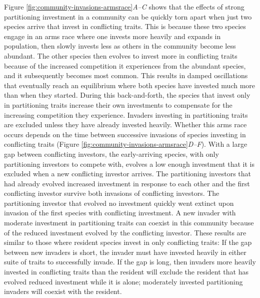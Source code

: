 Figure \ref{fig:community-invasions-armsrace}\textit{A--C} shows that
the effects of strong partitioning investment in a community can be quickly
torn apart when just two species arrive that invest in conflicting traits.
This is because these two species engage in an arms race where one invests
more heavily and expands in population, then slowly invests less as others
in the community become less abundant.
The other species then evolves to invest more in conflicting traits
because of the increased competition it experiences from the abundant species,
and it subsequently becomes most common.
This results in damped oscillations that eventually reach an equilibrium 
where both species have invested much more than when they started.
During this back-and-forth, the species that invest only in partitioning 
traits increase their own investments to compensate for the increasing 
competition they experience.
Invaders investing in partitioning traits are excluded unless
they have already invested heavily.
Whether this arms race occurs depends on the time between successive 
invasions of species investing in conflicting traits
(Figure \ref{fig:community-invasions-armsrace}\textit{D--F}).
With a large gap between conflicting investors,
the early-arriving species, with only partitioning investors to compete with,
evolves a low enough investment that it is excluded when a new 
conflicting investor arrives.
The partitioning investors that had already evolved increased investment
in response to each other and the first conflicting investor
survive both invasions of conflicting investors.
The partitioning investor that evolved no investment quickly went extinct
upon invasion of the first species with conflicting investment.
A new invader with moderate investment in partitioning traits
can coexist in this community because of the reduced investment
evolved by the conflicting investor.
These results are similar to those where resident species invest in
only conflicting traits:
If the gap between new invaders is short, the invader must have
invested heavily in either suite of traits to successfully invade.
If the gap is long, then invaders more heavily invested in conflicting traits
than the resident will exclude the resident that has evolved reduced investment
while it is alone;
moderately invested partitioning invaders will coexist with the resident.


